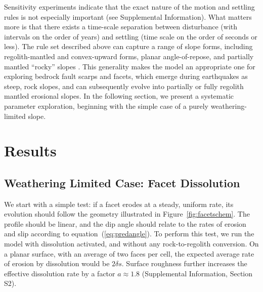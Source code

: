 Sensitivity experiments indicate that the exact nature of the motion and settling rules is not especially important (see Supplemental Information). What matters more is that there exists a time-scale separation between disturbance (with intervals on the order of years) and settling (time scale on the order of seconds or less). The rule set described above can capture a range of slope forms, including regolith-mantled and convex-upward forms, planar angle-of-repose, and partially mantled ``rocky'' slopes \citep{tucker2018lattice}. This generality makes the model an appropriate one for exploring bedrock fault scarps and facets, which emerge during earthquakes as steep, rock slopes, and can subsequently evolve into partially or fully regolith mantled erosional slopes. In the following section, we present %
a systematic parameter exploration, beginning with the simple case of a purely weathering-limited slope.


\section{Results}

\subsection{Weathering Limited Case: Facet Dissolution}

We start with a simple test: if a facet erodes at a steady, uniform rate, its evolution should follow the geometry illustrated in Figure~\ref{fig:facetschem}. The profile should be linear, and the dip angle should relate to the rates of erosion and slip according to equation~(\ref{eq:predangle}). To perform this test, we run the model with dissolution activated, and without any rock-to-regolith conversion. On a planar surface, with an average of two faces per cell, the expected average rate of erosion by dissolution would be $2\delta s$. Surface roughness further increases the effective dissolution rate by a factor $a\approx 1.8$ (Supplemental Information, Section S2).

